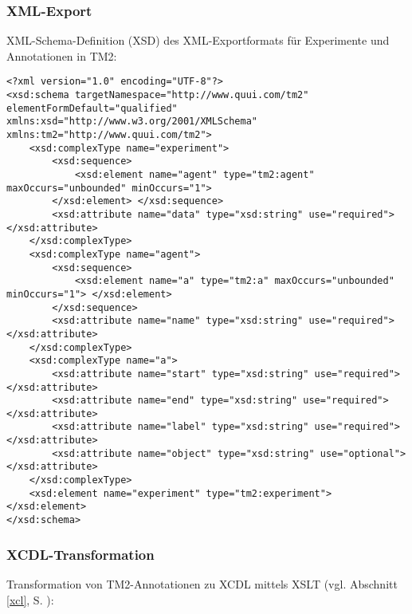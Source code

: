 \documentclass[abstracton, 12pt]{scrartcl}
\begin{document}
\subsubsection{XML-Export} \label{anhang-xml}

XML-Schema-Definition (XSD) des XML-Exportformats für Experimente und Annotationen in TM2:

\begin{lstlisting}
<?xml version="1.0" encoding="UTF-8"?>
<xsd:schema targetNamespace="http://www.quui.com/tm2" elementFormDefault="qualified" xmlns:xsd="http://www.w3.org/2001/XMLSchema" xmlns:tm2="http://www.quui.com/tm2">
    <xsd:complexType name="experiment">
        <xsd:sequence>
        	<xsd:element name="agent" type="tm2:agent" maxOccurs="unbounded" minOccurs="1">
        </xsd:element> </xsd:sequence>
        <xsd:attribute name="data" type="xsd:string" use="required"></xsd:attribute>
    </xsd:complexType>
    <xsd:complexType name="agent">
        <xsd:sequence>
        	<xsd:element name="a" type="tm2:a" maxOccurs="unbounded" minOccurs="1"> </xsd:element> 
        </xsd:sequence>
        <xsd:attribute name="name" type="xsd:string" use="required"></xsd:attribute>
    </xsd:complexType>
    <xsd:complexType name="a">
        <xsd:attribute name="start" type="xsd:string" use="required"></xsd:attribute>
        <xsd:attribute name="end" type="xsd:string" use="required"></xsd:attribute>
        <xsd:attribute name="label" type="xsd:string" use="required"></xsd:attribute>
        <xsd:attribute name="object" type="xsd:string" use="optional"></xsd:attribute>
    </xsd:complexType>
    <xsd:element name="experiment" type="tm2:experiment"></xsd:element>
</xsd:schema>
\end{lstlisting}

\subsubsection{XCDL-Transformation} \label{anhang-xcl}

Transformation von TM2-Annotationen zu XCDL mittels XSLT (vgl. Abschnitt \ref{xcl}, S. \pageref{xcl}):
\end{document}
